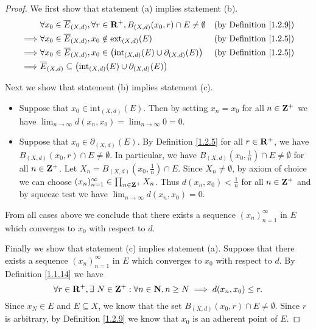 \begin{proof}
    We first show that statement (a) implies statement (b).
    \begin{align*}
                 & \forall x_0 \in \overline{E}_{(X, d)}, \forall r \in \mathbf{R}^+, B_{(X, d)}(x_0, r) \cap E \neq \emptyset       & \text{(by Definition \ref{1.2.9})} \\
        \implies & \forall x_0 \in \overline{E}_{(X, d)}, x_0 \notin \text{ext}_{(X, d)}(E)                                  & \text{(by Definition \ref{1.2.5})} \\
        \implies & \forall x_0 \in \overline{E}_{(X, d)}, x_0 \in \big(\text{int}_{(X, d)}(E) \cup \partial_{(X, d)}(E)\big) & \text{(by Definition \ref{1.2.5})} \\
        \implies & \overline{E}_{(X, d)} \subseteq \big(\text{int}_{(X, d)}(E) \cup \partial_{(X, d)}(E)\big)
    \end{align*}

    Next we show that statement (b) implies statement (c).
    \begin{itemize}
        \item Suppose that \(x_0 \in \text{int}_{(X, d)}(E)\).
              Then by setting \(x_n = x_0\) for all \(n \in \mathbf{Z}^+\) we have \(\lim_{n \to \infty} d(x_n, x_0) = \lim_{n \to \infty} 0 = 0\).
        \item Suppose that \(x_0 \in \partial_{(X, d)}(E)\).
              By Definition \ref{1.2.5} for all \(r \in \mathbf{R}^+\), we have \(B_{(X, d)}(x_0, r) \cap E \neq \emptyset\).
              In particular, we have \(B_{(X, d)}(x_0, \frac{1}{n}) \cap E \neq \emptyset\) for all \(n \in \mathbf{Z}^+\).
              Let \(X_n = B_{(X, d)}(x_0, \frac{1}{n}) \cap E\).
              Since \(X_n \neq \emptyset\), by axiom of choice we can choose \((x_n)_{n = 1}^\infty \in \prod_{n \in \mathbf{Z}^+} X_n\).
              Thus \(d(x_n, x_0) < \frac{1}{n}\) for all \(n \in \mathbf{Z}^+\) and by squeeze test we have \(\lim_{n \to \infty} d(x_n, x_0) = 0\).
    \end{itemize}
    From all cases above we conclude that there exists a sequence \((x_n)_{n = 1}^\infty\) in \(E\) which converges to \(x_0\) with respect to \(d\).

    Finally we show that statement (c) implies statement (a).
    Suppose that there exists a sequence \((x_n)_{n = 1}^\infty\) in \(E\) which converges to \(x_0\) with respect to \(d\).
    By Definition \ref{1.1.14} we have
    \[
        \forall r \in \mathbf{R}^+, \exists\ N \in \mathbf{Z}^+ : \forall n \in \mathbf{N}, n \geq N \implies d(x_n, x_0) \leq r.
    \]
    Since \(x_N \in E\) and \(E \subseteq X\), we know that the set \(B_{(X, d)}(x_0, r) \cap E \neq \emptyset\).
    Since \(r\) is arbitrary, by Definition \ref{1.2.9} we know that \(x_0\) is an adherent point of \(E\).
\end{proof}

